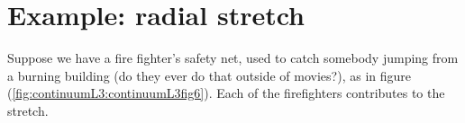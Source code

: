 \section{Example: radial stretch}

Suppose we have a fire fighter's safety net, used to catch somebody jumping from a burning building (do they ever do that outside of movies?), as in figure (\ref{fig:continuumL3:continuumL3fig6}).  Each of the firefighters contributes to the stretch.  


